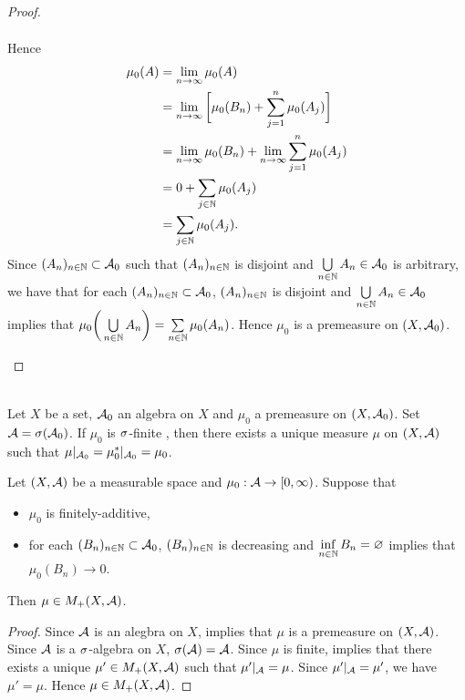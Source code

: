 \documentclass{book}
\begin{document}
\begin{proof}
\begin{enumerate}
\begin{align*}
			\end{align*}
			Hence 
			\begin{align*}
				\mu_0(A)
				& = \lim_{n \rightarrow \infty} \mu_0(A) \\
				& = \lim_{n \rightarrow \infty} \bigg[ \mu_0(B_n) + \sum\limits_{j=1}^n \mu_0(A_j) \bigg] \\
				& = \lim_{n \rightarrow \infty} \mu_0(B_n) + \lim_{n \rightarrow \infty} \sum\limits_{j=1}^n \mu_0(A_j) \\
				& = 0 + \sum_{j \in \mathbb{N}} \mu_0(A_j) \\
				& = \sum_{j \in \mathbb{N}} \mu_0(A_j).
			\end{align*}  
			Since $(A_n)_{n \in \mathbb{N}} \subset \mathcal{A}_0$ such that $(A_n)_{n \in \mathbb{N}}$ is disjoint and $\bigcup\limits_{n \in \mathbb{N}} A_n \in \mathcal{A}_0$ is arbitrary, we have that for each $(A_n)_{n \in \mathbb{N}} \subset \mathcal{A}_0$, $(A_n)_{n \in \mathbb{N}}$ is disjoint and $\bigcup\limits_{n \in \mathbb{N}} A_n \in \mathcal{A}_0$ implies that $\mu_0 \bigg(\bigcup\limits_{n\in \mathbb{N}}A_n \bigg) = \sum\limits_{n \in \mathbb{N}}\mu_0(A_n)$. Hence $\mu_0$ is a premeasure on $(X, \mathcal{A}_0)$.
		\end{enumerate}
	\end{proof}

	
	\begin{thm}   \\
		Let $X$ be a set, $\mathcal{A}_0$ an algebra on $X$ and $\mu_0$ a premeasure on $(X,\mathcal{A}_0)$. Set $\mathcal{A} = \sigma(\mathcal{A}_0)$. If $\mu_0$ is $\sigma$-finite , then there exists a unique measure $\mu$ on $(X, \mathcal{A})$ such that $\mu|_{\mathcal{A}_0} = \mu_0^*|_{\mathcal{A}_0} = \mu_0$. 
	\end{thm}

	
	\begin{ex} 
		Let $(X, \mathcal{A})$ be a measurable space and $\mu_0:\mathcal{A} \rightarrow [0,\infty)$. Suppose that
		\begin{itemize}
			\item $\mu_0$ is finitely-additive,
			\item for each $(B_n)_{n \in \mathbb{N}} \subset \mathcal{A}_0$, $(B_n)_{n \in \mathbb{N}} $ is decreasing and $\inf\limits_{n \in \mathbb{N}} B_n = \varnothing$ implies that $\mu_0(B_n) \rightarrow 0$.
		\end{itemize}  
		Then $\mu \in M_+(X, \mathcal{A})$. 
	\end{ex}
	
	\begin{proof}
		Since $\mathcal{A}$ is an alegbra on $X$,  implies that $\mu$ is a premeasure on $(X, \mathcal{A})$. Since $\mathcal{A}$ is a $\sigma$-algebra on $X$, $\sigma(\mathcal{A}) = \mathcal{A}$. Since $\mu$ is finite,  implies that there exists a unique $\mu' \in M_+(X, \mathcal{A})$ such that $\mu'|_{\mathcal{A}} = \mu$. Since $\mu'|_{\mathcal{A}} = \mu'$, we have $\mu' = \mu$. Hence $\mu \in M_+(X, \mathcal{A})$.
	\end{proof}
	
\end{document}
